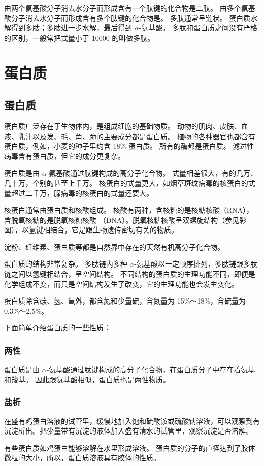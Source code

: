 由两个氨基酸分子消去水分子而形成含有一个肽键的化合物是二肽。
由多个氨基酸分子消去水分子而形成含有多个肽键的化合物是。
多肽通常呈链状。
蛋白质水解得到多肽；多肽进一步水解，最后得到 $\alpha$-氨基酸。
多肽和蛋白质之间没有严格的区别，一般常把式量小于 \num{10000} 的叫做多肽。

\section{蛋白质}
\subsection{蛋白质}
蛋白质广泛存在于生物体内，是组成细胞的基础物质。
动物的肌肉、皮肤、血液、乳汁以及发、毛、角、蹄的主要成分都是蛋白质。
植物的各种器官也都含有蛋白质，例如，小麦的种子里约含 18\% 蛋白质。
所有的酶都是蛋白质。
滤过性病毒含有蛋白质，但它的成分更复杂。

蛋白质是由 $\alpha$-氨基酸通过肽键构成的高分子化合物。
式量相差很大，有的几万、几十万，个别的甚至上千万。
核蛋白的式量更大，如烟草斑纹病毒的核蛋白的式量超过二千万，腺病毒的核蛋白的式量还要大。

\begin{Reading}[补充阅读]{}
核蛋白通常由蛋白质和核酸组成。
核酸有两种，含核糖的是核糖核酸（RNA），含脱氧核糖的是脱氧核糖核酸 （DNA）。脱氧核糖核酸呈双螺旋结构（参见彩图），以氢键相结合，它是跟生物遗传密切有关的物质。
\end{Reading}

淀粉、纤维素、蛋白质等都是自然界中存在的天然有机高分子化合物。

蛋白质的结构非常复杂。
多肽链内多种 $\alpha$-氨基酸以一定顺序排列，多肽链跟多肽链之间以氢键相结合，呈空间结构。
不同结构的蛋白质的生理功能不同，即便是化学组成不变，而只是空间结构发生了改变，它的生理功能也会发生变化。

蛋白质除含碳、氢、氧外，都含氮和少量硫，含氮量为 15\%～18\%，含硫量为 0.3\%～2.5\%。

下面简单介绍蛋白质的一些性质：
\subsubsection{两性}
蛋白质是由 $\alpha$-氨基酸通过肽键构成的高分子化合物，在蛋白质分子中存在着氨基和羧基。
因此跟氨基酸相似，蛋白质也是两性物质。
\subsubsection{盐析}
\begin{Experiment}
在盛有鸡蛋白溶液的试管里，缓慢地加入饱和硫酸铵或硫酸钠溶液，可以观察到有沉淀析出。把少量带有沉淀的液体加入盛有清水的试管里，观察沉淀是否溶解。
\end{Experiment}
有些蛋白质如鸡蛋白能够溶解在水里形成溶液。
蛋白质的分子的直径达到了胶体微粒的大小，所以，蛋白质溶液具有胶体的性质。

